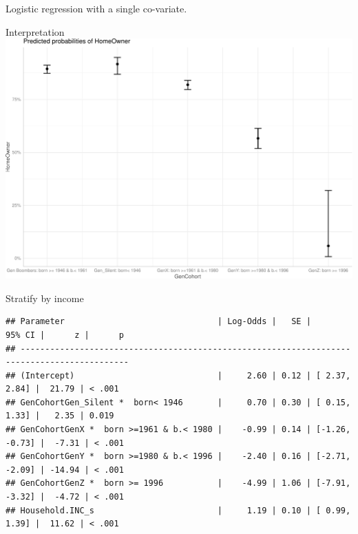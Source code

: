 \documentclass[
  ignorenonframetext,
]{beamer}
\begin{document}
\begin{frame}[fragile]{Logistic regression with a single co-variate.}
\begin{block}{Interpretation}
\protect\hypertarget{interpretation}{}
\includegraphics{slides_files/figure-beamer/unnamed-chunk-22-1.pdf}
\end{block}

\begin{block}{Stratify by income}
\protect\hypertarget{stratify-by-income}{}
\begin{verbatim}
## Parameter                               | Log-Odds |   SE |         95% CI |      z |      p
## --------------------------------------------------------------------------------------------
## (Intercept)                             |     2.60 | 0.12 | [ 2.37,  2.84] |  21.79 | < .001
## GenCohortGen_Silent *  born< 1946       |     0.70 | 0.30 | [ 0.15,  1.33] |   2.35 | 0.019 
## GenCohortGenX *  born >=1961 & b.< 1980 |    -0.99 | 0.14 | [-1.26, -0.73] |  -7.31 | < .001
## GenCohortGenY *  born >=1980 & b.< 1996 |    -2.40 | 0.16 | [-2.71, -2.09] | -14.94 | < .001
## GenCohortGenZ *  born >= 1996           |    -4.99 | 1.06 | [-7.91, -3.32] |  -4.72 | < .001
## Household.INC_s                         |     1.19 | 0.10 | [ 0.99,  1.39] |  11.62 | < .001
\end{verbatim}
\end{block}


\end{frame}
\end{document}
